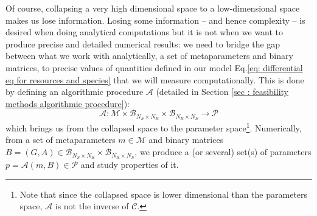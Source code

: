 \documentclass[12pt, titlepage]{report}
\begin{document}
Of course, collapsing a very high dimensional space to a low-dimensional space makes us lose information. Losing some information -- and hence complexity -- is desired when doing analytical computations but it is not when we want to produce precise and detailed numerical results: we need to bridge the gap between what we work with analytically, \ie a set of metaparameters and binary matrices, to precise values of quantities defined in our model Eq.\eqref{eq: differential eq for resources and species} that we will measure computationally. This is done by defining an algorithmic procedure $\mathcal{A}$ (detailed in Section \ref{sec : feasibility methods algorithmic procedure}):
\begin{equation}
\mathcal{A}: \mathcal{M} \times \mathcal{B}_{N_S\times N_R} \times \mathcal{B}_{N_R \times N_S} \rightarrow \mathcal{P}
\end{equation}
which brings us from the collapsed space to the parameter space\footnote{Note that since the collapsed space is lower dimensional than the parameters space, $\mathcal{A}$ is not the inverse of $\mathcal{C}$.}. Numerically, from a set of metaparameters $m \in \mathcal{M}$ and binary matrices $B=(G, A) \in \mathcal{B}_{N_S \times N_R} \times \mathcal{B}_{N_R \times N_S}$, we produce a (or several) set(s) of parameters $p = \mathcal{A}(m, B) \in \mathcal{P}$ and study properties of it.
\end{document}
